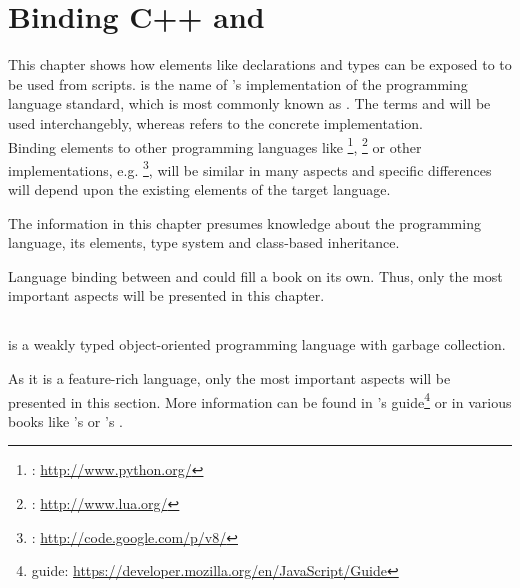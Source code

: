 \chapter{Binding C++ and }
\label{chap:LanguageBindingCPPJS}

This chapter shows how  elements like declarations and types can be exposed to  to be used from scripts.  is the name of 's implementation of the  programming language standard, which is most commonly known as . The terms  and \linebreak {} will be used interchangebly, whereas  refers to the \linebreak concrete  implementation.\\
Binding  elements to other programming languages like \footnote{: \url{http://www.python.org/}}, \footnote{: \url{http://www.lua.org/}} or other  implementations, e.g. \footnote{: \url{http://code.google.com/p/v8/}}, will be similar in many aspects and specific differences will depend upon the existing elements of the target language.

The information in this chapter presumes knowledge about the  programming language, its elements, type system and class-based inheritance.

Language binding between  and  could fill a book on its own. Thus, only the most important aspects will be presented in this chapter.

\section{}
\label{sec:JavaScript}

 is a weakly typed object-oriented programming language with garbage collection. 

As it is a feature-rich language, only the most important aspects will be presented in this section. More information can be found in 's  guide\footnote{ guide: \url{https://developer.mozilla.org/en/JavaScript/Guide}} or in various books like 's  or 's .

